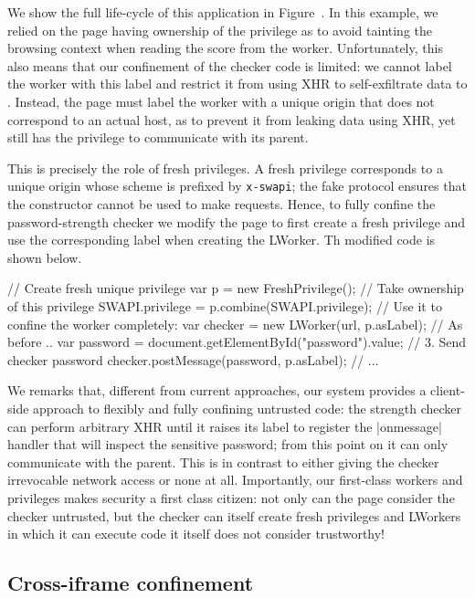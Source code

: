 \iffigures
\ifcompletefigures
We show the full life-cycle of this application in
Figure~.
\fi
\fi
%
In this example, we relied on the page having ownership of the
 privilege as to avoid tainting the browsing
context when reading the score from the worker.
%
Unfortunately, this also means that our confinement of the checker
code is limited: we cannot label the worker with this label and
restrict it from using XHR to self-exfiltrate data to
.
%
Instead, the page must label the worker with a unique origin that does
not correspond to an actual host, as to prevent it from leaking data
using XHR, yet still has the privilege to communicate with its parent.

This is precisely the role of fresh privileges.
%
A fresh privilege corresponds to a unique origin whose scheme is
prefixed by \texttt{x-swapi}; the fake protocol ensures that the
\xhr{} constructor cannot be used to make requests.
%
Hence, to fully confine the password-strength checker we modify the
 page to first create a fresh privilege and use the
corresponding label when creating the LWorker.
%
Th modified code is shown below.
\begin{jscode}
// Create fresh unique privilege
var p = new FreshPrivilege();
// Take ownership of this privilege
SWAPI.privilege = p.combine(SWAPI.privilege);
// Use it to confine the worker completely:
var checker = new LWorker(url, p.asLabel);
// As before ..
var password = 
 document.getElementById("password").value;
// 3. Send checker password 
checker.postMessage(password, p.asLabel);
// ...
\end{jscode}

We remarks that, different from current approaches, our system
provides a client-side approach to flexibly and fully confining
untrusted code:
%
the strength checker can perform arbitrary XHR until it raises its
label to register the \js|onmessage| handler that will inspect the
sensitive password; from this point on it can only communicate with
the parent.
%
This is in contrast to either giving the checker irrevocable network
access or none at all.
%
Importantly, our first-class workers and privileges makes security a
first class citizen: not only can the page consider the checker
untrusted, but the checker can itself create fresh privileges and 
LWorkers in which it can execute code it itself does not consider
trustworthy!

\subsection{Cross-iframe confinement}
\label{sec:system:iframe}

